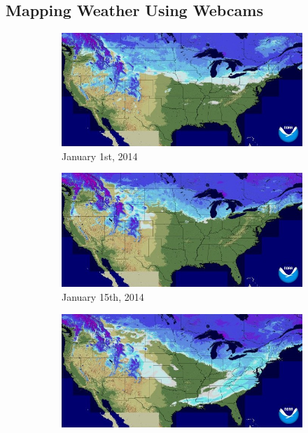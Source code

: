 \documentclass[10pt,twocolumn,letterpaper]{article}
\begin{document}
\subsection{Mapping Weather Using Webcams}

\begin{figure}
  \centering
  \begin{subfigure}[b]{0.33\textwidth}
    \centering
		\includegraphics[width=\textwidth, trim= 0mm 0mm 0mm 0mm]{figs/snow_gt_1.jpg}
    \caption{January 1st, 2014}
    \label{fig:snow_map_gt_1}
  \end{subfigure}
  \begin{subfigure}[b]{0.33\textwidth}
    \centering
		\includegraphics[width=\textwidth, trim= 0mm 0mm 0mm 0mm]{figs/snow_gt_2.jpg}
    \caption{January 15th, 2014}
    \label{fig:snow_map_gt_2}
  \end{subfigure}
  \begin{subfigure}[b]{0.33\textwidth}
    \centering
		\includegraphics[width=\textwidth, trim= 0mm 0mm 0mm 0mm]{figs/snow_gt_3.jpg}

\end{subfigure}
\end{figure}
\end{document}
